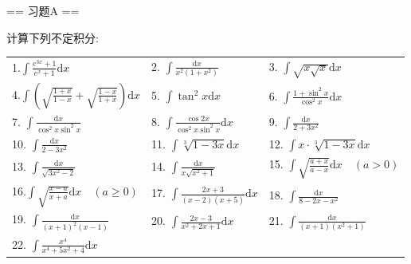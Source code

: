 \newenvironment{solution}{\begin{proofc}[解答]}{\end{proofc}}

== 习题A ==

计算下列不定积分:

\begin{center}
\begin{tabular}{l l l}
    1.$\displaystyle\int \frac{e^{3x} + 1}{e^{x} + 1} \mathrm{d}x$ 
    & 2. $\displaystyle\int \frac{\mathrm{d}x}{x^2(1 + x^2)}$ 
    & 3. $\displaystyle\int \sqrt{x\sqrt{x}} \mathrm{d}x$\\
    4.$\displaystyle\int \left(\sqrt{\frac{1 + x}{1 - x}} + \sqrt{\frac{1 - x}{1 + x}}\right)\mathrm{d}x$
    & 5. $\displaystyle \int \tan^2 x \mathrm{d}x$
    & 6. $\displaystyle \int \frac{1 + \sin^2 x}{\cos^2 x} \mathrm{d}x$\\
    7. $\displaystyle \int \frac{\mathrm{d}x}{\cos^2 x \sin^2 x}$
    & 8. $\displaystyle \int \frac{\cos 2x}{\cos^2 x \sin^2 x} \mathrm{d}x$
    & 9. $\displaystyle \int \frac{\mathrm{d}x}{2 + 3x^2}$\\
    10. $\displaystyle \int \frac{\mathrm{d}x}{2 - 3x^2}$
    & 11. $\displaystyle \int \sqrt[3]{1 - 3x} \mathrm{d}x$
    & 12. $\displaystyle \int x \cdot \sqrt[3]{1 - 3x} \mathrm{d}x$\\
    13. $\displaystyle \int \frac{\mathrm{d}x}{\sqrt{3x^2 - 2}}$
    & 14. $\displaystyle \int \frac{\mathrm{d}x}{x\sqrt{x^2 + 1}}$
    & 15. $\displaystyle \int \sqrt{\frac{a + x}{a - x}} \mathrm{d}x \quad (a > 0)$\\
    16.$\displaystyle \int \sqrt{\frac{x - a}{x + a}} \mathrm{d}x \quad (a \geq 0)$
    & 17. $\displaystyle \int \frac{2x + 3}{(x - 2)(x + 5)} \mathrm{d}x$
    & 18. $\displaystyle \int \frac{\mathrm{d}x}{8 - 2x - x^2}$\\
    19. $\displaystyle \int \frac{\mathrm{d}x}{(x + 1)^2(x - 1)}$
    & 20. $\displaystyle \int \frac{2x - 3}{x^2 + 2x + 1} \mathrm{d}x$
    & 21. $\displaystyle \int \frac{\mathrm{d}x}{(x + 1)(x^2 + 1)}$\\
    22. $\displaystyle \int \frac{x^4}{x^4 + 5x^2 + 4} \mathrm{d}x$

\end{tabular}
\end{center}
